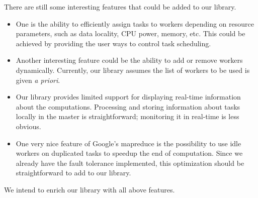 \documentclass[preprint]{sigplanconf}
\begin{document}
There are still some interesting features that could be added to our
library. 
\begin{itemize}
\item 
  One is the ability to efficiently assign tasks to workers depending
  on resource parameters, such as data locality, CPU power, memory,
  etc. This could be achieved by providing the user ways to control
  task scheduling.  
\item 
  Another interesting feature could be the ability
  to add or remove workers dynamically. Currently, our library assumes
  the list of workers to be used is given \emph{a priori}.
\item
  Our library provides limited support for displaying real-time
  information about the computations. Processing and storing
  information about tasks locally in the master is straightforward; 
  monitoring it in real-time is less obvious.
\item 
  One very nice feature of Google's mapreduce is the possibility to
  use idle workers on duplicated tasks to speedup the end of computation.
  Since we already have the fault tolerance implemented, this
  optimization should be straightforward to add to our library.
\end{itemize}
We intend to enrich our library with all above features.






\nocite{*}


\end{document}
